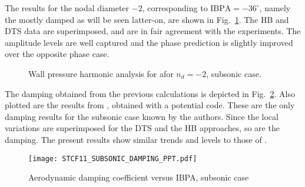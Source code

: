 The results for the  nodal  diameter $-2$, corresponding to $\text{IBPA}=-36^\circ$, namely
the mostly damped as will be seen latter-on, are shown
in Fig.~\ref{fig:stcf11_ael_subsonic_ibpa_324_paper}. The HB and DTS data
are superimposed, and are in fair agreement with the experiments. The
amplitude levels are well captured and the phase prediction is
slightly improved over the opposite phase case.
\begin{figure}
  \centering
  \caption{Wall pressure harmonic analysis for afor \mbox{$n_d=-2$}, subsonic case.}
  \label{fig:stcf11_ael_subsonic_ibpa_324_paper}
\end{figure}

The damping obtained from the previous calculations is depicted 
in Fig.~\ref{fig:stcf11_subsonic_damping}.  Also plotted are the results
from \citet{Fransson1999}, obtained with a
potential code.
These are the only damping results for the
subsonic case known by the authors.  Since the local variations are
superimposed for the DTS and the HB approaches, so are the damping.
The present
results show similar trends and levels to those of \citet{Fransson1999}.
\begin{figure}
  \centering
  \texttt{[image: STCF11\_SUBSONIC\_DAMPING\_PPT.pdf]}
  \caption{Aerodynamic damping coefficient versus IBPA, subsonic case}
  \label{fig:stcf11_subsonic_damping}
\end{figure}